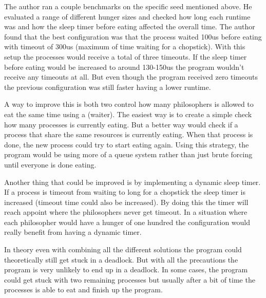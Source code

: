 \documentclass[a4paper,11pt]{article}
\begin{document}
The author ran a couple benchmarks on the specific seed mentioned above. He evaluated a range of different hunger sizes and checked how long each runtime was and how the sleep timer before eating affected the overall time. The author found that the best configuration was that the process waited 100us before eating with timeout of 300us (maximum of time waiting for a chopstick). With this setup the processes would receive a total of three timeouts. If the sleep timer before eating would be increased to around 130-150us the program wouldn't receive any timeouts at all. But even though the program received zero timeouts the previous configuration was still faster having a lower runtime.

A way to improve this is both two control how many philosophers is allowed to eat the same time using a (waiter). The easiest way is to create a simple check how many processes is currently eating. But a better way would check if a process that share the same resources is currently eating. When that process is done, the new process could try to start eating again. Using this strategy, the program would be using more of a queue system rather than just brute forcing until everyone is done eating.

Another thing that could be improved is by implementing a dynamic sleep timer. If a process is timeout from waiting to long for a chopstick the sleep timer is increased (timeout time could also be increased). By doing this the timer will reach appoint where the philosophers never get timeout. In a situation where each philosopher would have a hunger of one hundred the configuration would really benefit from having a dynamic timer.

In theory even with combining all the different solutions the program could theoretically still get stuck in a deadlock. But with all the precautions the program is very unlikely to end up in a deadlock. In some cases, the program could get stuck with two remaining processes but usually after a bit of time the processes is able to eat and finish up the program.
\end{document}
